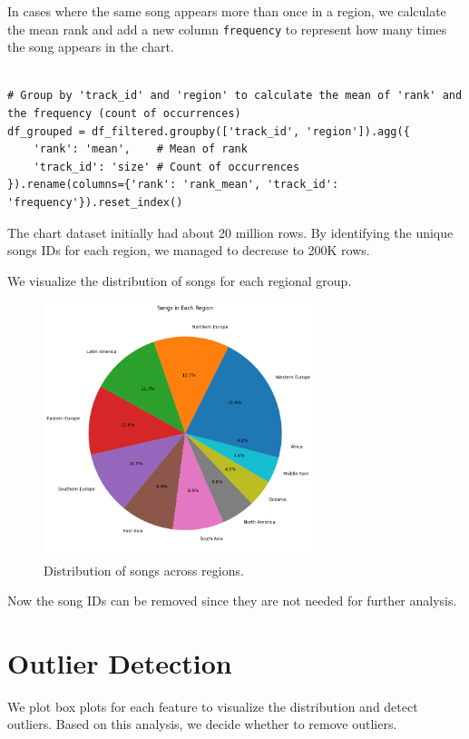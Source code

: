 In cases where the same song appears more than once in a region, we calculate the mean rank and add a new column \texttt{frequency} to represent how many times the song appears in the chart.

\begin{verbatim}

# Group by 'track_id' and 'region' to calculate the mean of 'rank' and the frequency (count of occurrences)
df_grouped = df_filtered.groupby(['track_id', 'region']).agg({
    'rank': 'mean',    # Mean of rank 
    'track_id': 'size' # Count of occurrences 
}).rename(columns={'rank': 'rank_mean', 'track_id': 'frequency'}).reset_index()
\end{verbatim}

The chart dataset initially had about 20 million rows. By identifying the unique songs IDs for each region, we managed to decrease to 200K rows.

\newpage
We visualize the distribution of songs for each regional group.


\begin{figure}[h]
    \centering
    \includegraphics[width=0.7\textwidth]{media/region_songs.png} 
    \caption{Distribution of songs across regions.}
    \label{pie_chart}
\end{figure}


Now the song IDs can be removed since they are not needed for further analysis.


\section{Outlier Detection}

We plot box plots for each feature to visualize the distribution and detect outliers. Based on this analysis, we decide whether to remove outliers.

